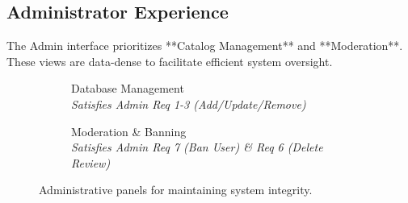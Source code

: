 \subsection{Administrator Experience}
The Admin interface prioritizes **Catalog Management** and **Moderation**. These views are data-dense to facilitate efficient system oversight.

\begin{figure}[H]
    \centering
    \begin{subfigure}[b]{0.45\textwidth}
        \centering
        \caption{Database Management \\ \textit{Satisfies Admin Req 1-3 (Add/Update/Remove)}}
        \label{fig:mockup_admin_catalog}
    \end{subfigure}
    \hfill
    \begin{subfigure}[b]{0.45\textwidth}
        \centering
        \caption{Moderation \& Banning \\ \textit{Satisfies Admin Req 7 (Ban User) \& Req 6 (Delete Review)}}
        \label{fig:mockup_admin_mod}
    \end{subfigure}
    \caption{Administrative panels for maintaining system integrity.}
    \label{fig:mockup_admin_group}
\end{figure}